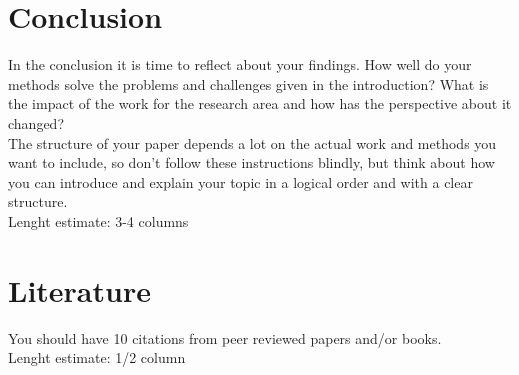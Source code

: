 \documentclass[sigconf,natbib=false]{acmart}
\begin{document}
\section{Conclusion}
In the conclusion it is time to reflect about your findings. How well do your methods solve the problems and challenges given in the introduction? What is the impact of the work for the research area and how has the perspective about it changed?\\
	The structure of your paper depends a lot on the actual work and
methods you want to include, so don't follow these instructions blindly, but think about how you can introduce and explain your topic in a logical order and with a clear structure. \\
Lenght estimate: 3-4 columns

\section{Literature}
You should have 10 citations from peer reviewed papers and/or books. \\
Lenght estimate: 1/2 column
\end{document}
